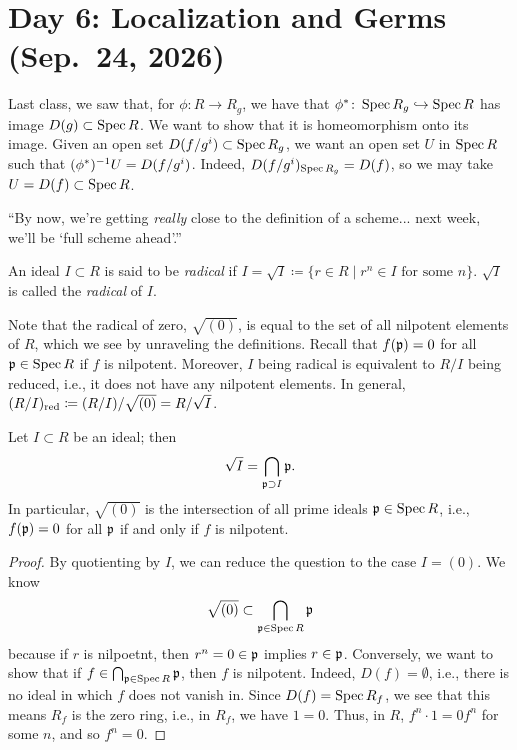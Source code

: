 \section{Day 6: Localization and Germs (Sep.\ 24, 2026)}
Last class, we saw that, for $\phi \colon R \to R_g$, we have that $\phi^\ast \colon \operatorname{Spec} R_g \hookrightarrow \operatorname{Spec} R$ has image $D(g) \subset \operatorname{Spec} R$. We want to show that it is homeomorphism onto its image. Given an open set $D(f/g^i) \subset \operatorname{Spec} R_g$, we want an open set $U$ in $\operatorname{Spec} R$ such that $(\phi^\ast)^{-1} U = D(f/g^i)$. Indeed, $D(f/g^i)_{\operatorname{Spec} R_g} = D(f)$, so we may take $U = D(f) \subset \operatorname{Spec} R$.

{\color{airforceblue} ``By now, we're getting \textit{really} close to the definition of a scheme... next week, we'll be `full scheme ahead'.''}

\begin{definition} \label{defn:radical_ideal}
    An ideal $I \subset R$ is said to be \textit{radical} if $I = \sqrt I \coloneq \{r \in R \mid r^n \in I \text{ for some $n$}\}$. $\sqrt I$ is called the \textit{radical} of $I$.
\end{definition}

Note that the radical of zero, $\sqrt{(0)}$, is equal to the set of all nilpotent elements of $R$, which we see by unraveling the definitions. Recall that $f(\mathfrak p) = 0$ for all $\mathfrak p \in \operatorname{Spec} R$ if $f$ is nilpotent. Moreover, $I$ being radical is equivalent to $R/I$ being reduced, i.e., it does not have any nilpotent elements. In general, $(R/I)_{\operatorname{red}} \coloneq (R/I)/\sqrt{(0)} = R/\sqrt{I}$.

\begin{theorem} \label{thm:expression_for_radical}
    Let $I \subset R$ be an ideal; then
    \[ \sqrt I = \bigcap_{\mathfrak p \supset I} \mathfrak p. \]
    In particular, $\sqrt{(0)}$ is the intersection of all prime ideals $\mathfrak p \in \operatorname{Spec} R$, i.e., $f(\mathfrak p) = 0$ for all $\mathfrak p$ if and only if $f$ is nilpotent. 
\end{theorem}
\begin{proof}
    By quotienting by $I$, we can reduce the question to the case $I = (0)$. We know
    \[ \sqrt{(0)} \subset \bigcap_{\mathfrak p \in \operatorname{Spec} R} \mathfrak p \]
    because if $r$ is nilpoetnt, then $r^n = 0 \in \mathfrak p$ implies $r \in \mathfrak p$. Conversely, we want to show that if $f \in \bigcap_{\mathfrak p \in \operatorname{Spec} R} \mathfrak p$, then $f$ is nilpotent. Indeed, $D(f) = \emptyset$, i.e., there is no ideal in which $f$ does not vanish in. Since $D(f) = \operatorname{Spec} R_f$, we see that this means $R_f$ is the zero ring, i.e., in $R_f$, we have $1 = 0$. Thus, in $R$, $f^n \cdot 1 = 0 f^n$ for some $n$, and so $f^n = 0$.
\end{proof}


